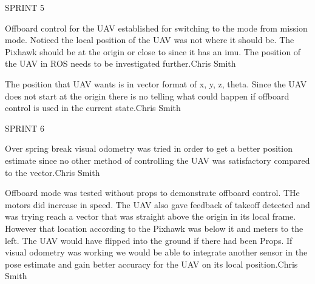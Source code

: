\begin{description}
\item SPRINT 5

\item [2/15/16]  Offboard control for the UAV established for switching to the mode from mission mode. Noticed the local position of the UAV was not where it should be. The Pixhawk should be at the origin or close to since it has an imu. The position of the UAV in ROS needs to be investigated further.\hfill{Chris Smith}

\item [2/22/16]  The position that UAV wants is in vector format of x, y, z, theta. Since the UAV does not start at the origin there is no telling what could happen if offboard control is used in the current state.\hfill{Chris Smith}

\item SPRINT 6

\item [3/21/16]  Over spring break visual odometry was tried in order to get a better position estimate since no other method of controlling the UAV was satisfactory compared to the vector.\hfill{Chris Smith}

\item [3/28/16]  Offboard mode was tested without props to demonstrate offboard control. THe motors did increase in speed. The  UAV also gave feedback of takeoff detected and was trying reach a vector that was straight above the origin in its local frame. However that location according to the Pixhawk was below it and meters to the left. The UAV would have flipped into the ground if there had been Props. If visual odometry was working we would be able to integrate another sensor in the pose estimate and gain better accuracy for the UAV on its local position.\hfill{Chris Smith}
\end{description}
